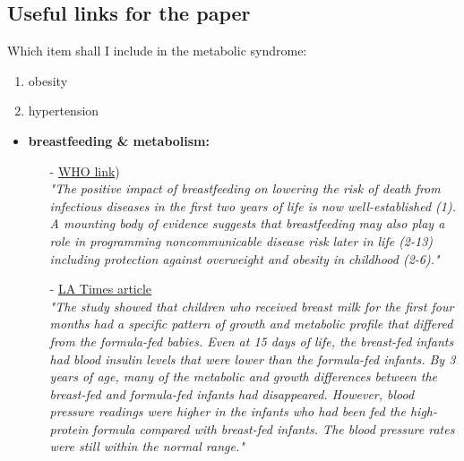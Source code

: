 \documentclass[11pt, a4paper,draft]{article} %
\begin{document}
\newpage
\subsection{Useful links for the paper}

Which item shall I include in the metabolic syndrome: 
\begin{enumerate}
\item obesity
\item hypertension
\end{enumerate}

\begin{itemize}
\item \textbf{breastfeeding \& metabolism:}

\begin{itemize}
\item[-]\href{http://www.who.int/elena/titles/bbc/breastfeeding_childhood_obesity/en/}{WHO link})\\ 
\textit{"The positive impact of breastfeeding on lowering the risk of death from infectious diseases in the first two years of life is now well-established (1). A mounting body of evidence suggests that breastfeeding may also play a role in programming noncommunicable disease risk later in life (2-13) including protection against overweight and obesity in childhood (2-6)."}

\item[-]\href{http://articles.latimes.com/2011/may/02/news/la-heb-infant-feeding-20110502}{LA Times article}\\
\textit{"The study showed that children who received breast milk for the first four months had a specific pattern of growth and metabolic profile that differed from the formula-fed babies. Even at 15 days of life, the breast-fed infants had blood insulin levels that were lower than the formula-fed infants.\newline
By 3 years of age, many of the metabolic and growth differences between the breast-fed and formula-fed infants had disappeared. However, blood pressure readings were higher in the infants who had been fed the high-protein formula compared with breast-fed infants. The blood pressure rates were still within the normal range."}
\end{itemize}
\end{itemize}
\end{document}
